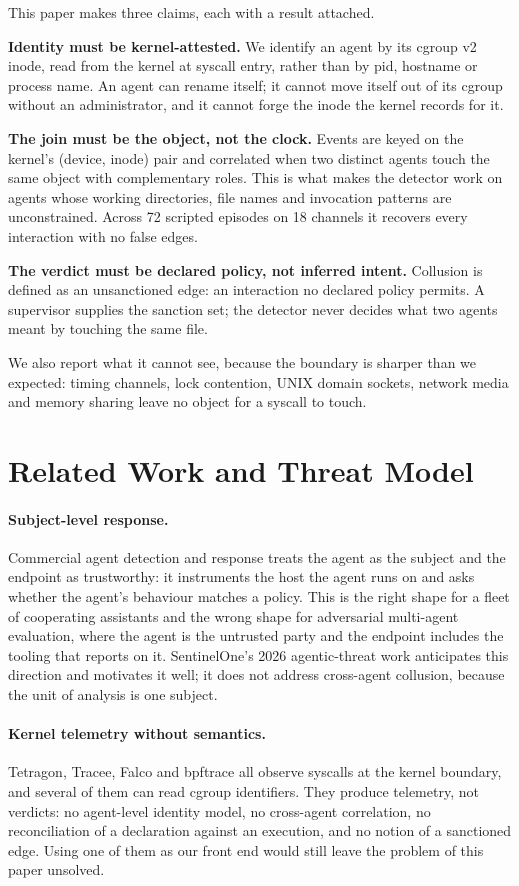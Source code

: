 \documentclass[11pt]{article}
\begin{document}
This paper makes three claims, each with a result attached.

\textbf{Identity must be kernel-attested.} We identify an agent by its cgroup v2
inode, read from the kernel at syscall entry, rather than by pid, hostname or
process name. An agent can rename itself; it cannot move itself out of its cgroup
without an administrator, and it cannot forge the inode the kernel records for it.

\textbf{The join must be the object, not the clock.} Events are keyed on the
kernel's (device, inode) pair and correlated when two distinct agents touch the
same object with complementary roles. This is what makes the detector work on
agents whose working directories, file names and invocation patterns are
unconstrained. Across 72 scripted episodes on 18 channels it recovers every
interaction with no false edges.

\textbf{The verdict must be declared policy, not inferred intent.} Collusion is
defined as an unsanctioned edge: an interaction no declared policy permits. A
supervisor supplies the sanction set; the detector never decides what two agents
meant by touching the same file.

We also report what it cannot see, because the boundary is sharper than we
expected: timing channels, lock contention, UNIX domain sockets, network media and
memory sharing leave no object for a syscall to touch.

\section{Related Work and Threat Model}

\paragraph{Subject-level response.} Commercial agent detection and response treats
the agent as the subject and the endpoint as trustworthy: it instruments the host
the agent runs on and asks whether the agent's behaviour matches a policy. This is
the right shape for a fleet of cooperating assistants and the wrong shape for
adversarial multi-agent evaluation, where the agent is the untrusted party and the
endpoint includes the tooling that reports on it. SentinelOne's 2026
agentic-threat work anticipates this direction and motivates it well; it does not
address cross-agent collusion, because the unit of analysis is one subject.

\paragraph{Kernel telemetry without semantics.} Tetragon, Tracee, Falco and
bpftrace all observe syscalls at the kernel boundary, and several of them can read
cgroup identifiers. They produce telemetry, not verdicts: no agent-level identity
model, no cross-agent correlation, no reconciliation of a declaration against an
execution, and no notion of a sanctioned edge. Using one of them as our front end
would still leave the problem of this paper unsolved.
\end{document}
